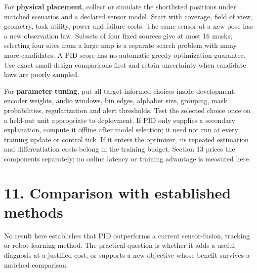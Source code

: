 \documentclass[11pt,a4paper]{article}
\begin{document}
For \textbf{physical placement}, collect or simulate the shortlisted positions under matched scenarios and a declared sensor model. Start with coverage, field of view, geometry, task utility, power and failure costs. The same sensor at a new pose has a new observation law. Subsets of four fixed sources give at most 16 masks; selecting four sites from a large map is a separate search problem with many more candidates. A PID score has no automatic greedy-optimization guarantee. Use exact small-design comparisons first and retain uncertainty when candidate laws are poorly sampled.

For \textbf{parameter tuning}, put all target-informed choices inside development: encoder weights, audio windows, bin edges, alphabet size, grouping, mask probabilities, regularization and alert thresholds. Test the selected choice once on a held-out unit appropriate to deployment. If PID only supplies a secondary explanation, compute it offline after model selection; it need not run at every training update or control tick. If it enters the optimizer, its repeated estimation and differentiation costs belong in the training budget. Section 13 prices the components separately; no online latency or training advantage is measured here.

\par{}

\section{11. Comparison with established methods}\label{comparison-with-established-methods}

No result here establishes that PID outperforms a current sensor-fusion, tracking or robot-learning method. The practical question is whether it adds a useful diagnosis at a justified cost, or supports a new objective whose benefit survives a matched comparison.
\end{document}
